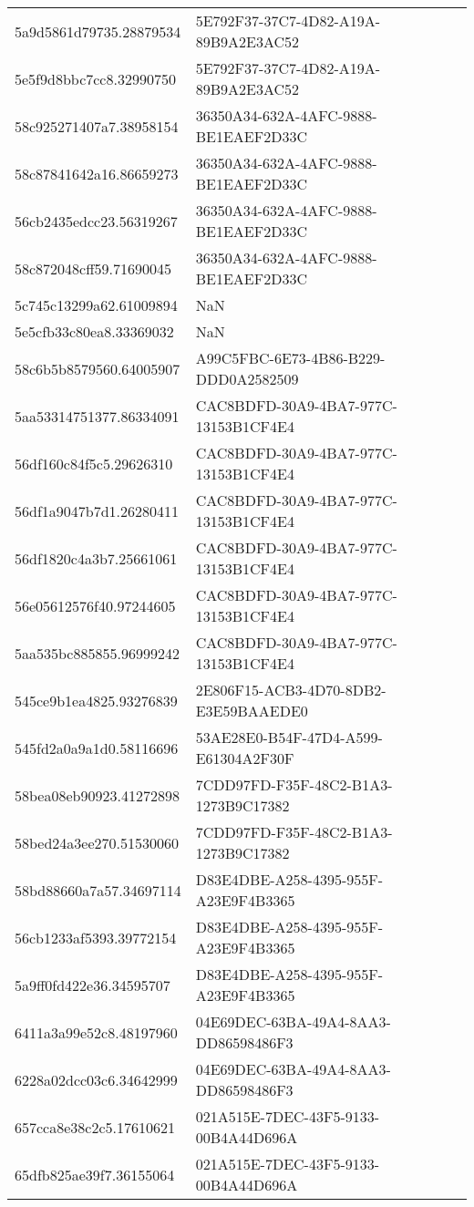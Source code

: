 \begin{tabular}{ll}
5a9d5861d79735.28879534 & 5E792F37-37C7-4D82-A19A-89B9A2E3AC52 \\
5e5f9d8bbc7cc8.32990750 & 5E792F37-37C7-4D82-A19A-89B9A2E3AC52 \\
58c925271407a7.38958154 & 36350A34-632A-4AFC-9888-BE1EAEF2D33C \\
58c87841642a16.86659273 & 36350A34-632A-4AFC-9888-BE1EAEF2D33C \\
56cb2435edcc23.56319267 & 36350A34-632A-4AFC-9888-BE1EAEF2D33C \\
58c872048cff59.71690045 & 36350A34-632A-4AFC-9888-BE1EAEF2D33C \\
5c745c13299a62.61009894 & NaN \\
5e5cfb33c80ea8.33369032 & NaN \\
58c6b5b8579560.64005907 & A99C5FBC-6E73-4B86-B229-DDD0A2582509 \\
5aa53314751377.86334091 & CAC8BDFD-30A9-4BA7-977C-13153B1CF4E4 \\
56df160c84f5c5.29626310 & CAC8BDFD-30A9-4BA7-977C-13153B1CF4E4 \\
56df1a9047b7d1.26280411 & CAC8BDFD-30A9-4BA7-977C-13153B1CF4E4 \\
56df1820c4a3b7.25661061 & CAC8BDFD-30A9-4BA7-977C-13153B1CF4E4 \\
56e05612576f40.97244605 & CAC8BDFD-30A9-4BA7-977C-13153B1CF4E4 \\
5aa535bc885855.96999242 & CAC8BDFD-30A9-4BA7-977C-13153B1CF4E4 \\
545ce9b1ea4825.93276839 & 2E806F15-ACB3-4D70-8DB2-E3E59BAAEDE0 \\
545fd2a0a9a1d0.58116696 & 53AE28E0-B54F-47D4-A599-E61304A2F30F \\
58bea08eb90923.41272898 & 7CDD97FD-F35F-48C2-B1A3-1273B9C17382 \\
58bed24a3ee270.51530060 & 7CDD97FD-F35F-48C2-B1A3-1273B9C17382 \\
58bd88660a7a57.34697114 & D83E4DBE-A258-4395-955F-A23E9F4B3365 \\
56cb1233af5393.39772154 & D83E4DBE-A258-4395-955F-A23E9F4B3365 \\
5a9ff0fd422e36.34595707 & D83E4DBE-A258-4395-955F-A23E9F4B3365 \\
6411a3a99e52c8.48197960 & 04E69DEC-63BA-49A4-8AA3-DD86598486F3 \\
6228a02dcc03c6.34642999 & 04E69DEC-63BA-49A4-8AA3-DD86598486F3 \\
657cca8e38c2c5.17610621 & 021A515E-7DEC-43F5-9133-00B4A44D696A \\
65dfb825ae39f7.36155064 & 021A515E-7DEC-43F5-9133-00B4A44D696A \\

\end{tabular}
